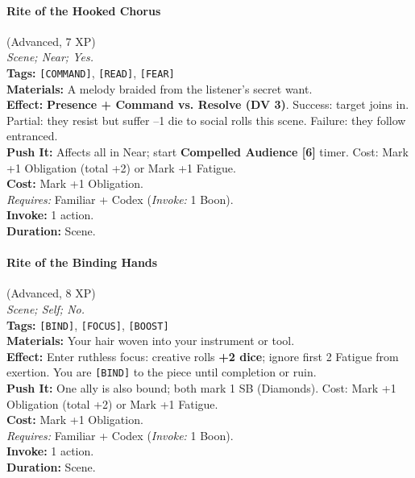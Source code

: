 \paragraph{Rite of the Hooked Chorus} (Advanced, 7 XP) \hfill \\
\emph{Scene; Near; Yes.} \\
\textbf{Tags:} \texttt{[COMMAND]}, \texttt{[READ]}, \texttt{[FEAR]} \\
\textbf{Materials:} A melody braided from the listener's secret want. \\
\textbf{Effect:} \textbf{Presence + Command vs. Resolve (DV 3)}. Success: target joins in. Partial: they resist but suffer --1 die to social rolls this scene. Failure: they follow entranced. \\
\textbf{Push It:} Affects all in Near; start \textbf{Compelled Audience [6]} timer. Cost: Mark +1 Obligation (total +2) or Mark +1 Fatigue. \\
\textbf{Cost:} Mark +1 Obligation. \\
\textit{Requires:} Familiar + Codex (\textit{Invoke:} 1 Boon). \\
\textbf{Invoke:} 1 action. \\
\textbf{Duration:} Scene.

\paragraph{Rite of the Binding Hands} (Advanced, 8 XP) \hfill \\
\emph{Scene; Self; No.} \\
\textbf{Tags:} \texttt{[BIND]}, \texttt{[FOCUS]}, \texttt{[BOOST]} \\
\textbf{Materials:} Your hair woven into your instrument or tool. \\
\textbf{Effect:} Enter ruthless focus: creative rolls \textbf{+2 dice}; ignore first 2 Fatigue from exertion. You are \texttt{[BIND]} to the piece until completion or ruin. \\
\textbf{Push It:} One ally is also bound; both mark 1 SB (Diamonds). Cost: Mark +1 Obligation (total +2) or Mark +1 Fatigue. \\
\textbf{Cost:} Mark +1 Obligation. \\
\textit{Requires:} Familiar + Codex (\textit{Invoke:} 1 Boon). \\
\textbf{Invoke:} 1 action. \\
\textbf{Duration:} Scene.

